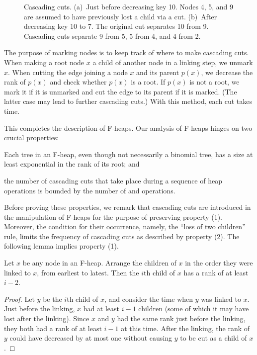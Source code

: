 \begin{figure}
    \caption{Cascading cuts. (a)~Just before decreasing key 10. Nodes 4, 5, and 9 are
    assumed to have previously lost a child via a cut. (b)~After decreasing key 10 to
    7. The original cut separates 10 from 9. Cascading cuts separate 9 from 5, 5 from
    4, and 4 from 2.}
    \label{fig:cascading-cuts}
\end{figure}

The purpose of marking nodes is to keep track of where to make cascading cuts. When
making a root node \(x\) a child of another node in a linking step, we unmark \(x\).
When cutting the edge joining a node \(x\) and its parent \(p(x)\), we decrease the
rank of \(p(x)\) and check whether \(p(x)\) is a root. If \(p(x)\) is not a root, we
mark it if it is unmarked and cut the edge to its parent if it is marked. (The latter
case may lead to further cascading cuts.) With this method, each cut takes 
time.

This completes the description of F-heaps. Our analysis of F-heaps hinges on two
crucial properties: \begin{inparaenum}[(1)]
    \item Each tree in an F-heap, even though not necessarily a binomial tree, has
        a size at least exponential in the rank of its root; and
    \item the number of cascading cuts that take place during a sequence of heap
    operations is bounded by the number of  and 
    operations.
\end{inparaenum}
Before proving these properties, we remark that cascading cuts are introduced in the
manipulation of F-heaps for the purpose of preserving property (1). Moreover, the
condition for their occurrence, namely, the ``loss of two children'' rule, limits the
frequency of cascading cuts as described by property (2). The following lemma implies
property (1).

\begin{lemma}
    \label{lemma:child-rank}
    Let \(x\) be any node in an F-heap. Arrange the children of \(x\) in the order
    they were linked to \(x\), from earliest to latest. Then the \(i\)th child of
    \(x\) has a rank of at least \(i - 2\).
\end{lemma}

\begin{proof}
    Let \(y\) be the \(i\)th child of \(x\), and consider the time when \(y\) was
    linked to \(x\). Just before the linking, \(x\) had at least \(i - 1\) children
    (some of which it may have lost after the linking). Since \(x\) and \(y\) had the
    same rank just before the linking, they both had a rank of at least \(i - 1\) at
    this time. After the linking, the rank of \(y\) could have decreased by at most
    one without causing \(y\) to be cut as a child of \(x\).
\end{proof}

